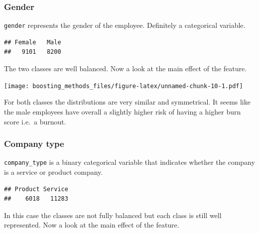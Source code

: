 \documentclass[
]{book}
\newenvironment{Shaded}{\begin{snugshade}}{\end{snugshade}}
\newcommand{\CommentTok}[1]{\textcolor[rgb]{0.56,0.35,0.01}{\textit{#1}}}
\newcommand{\FunctionTok}[1]{\textcolor[rgb]{0.00,0.00,0.00}{#1}}
\newcommand{\NormalTok}[1]{#1}
\newcommand{\SpecialCharTok}[1]{\textcolor[rgb]{0.00,0.00,0.00}{#1}}
\begin{document}
\hypertarget{gender}{%
\subsubsection{Gender}\label{gender}}

\texttt{gender} represents the gender of the employee. Definitely a categorical variable.

\begin{Shaded}
\end{Shaded}

\begin{verbatim}
## Female   Male 
##   9101   8200
\end{verbatim}

The two classes are well balanced. Now a look at the main effect of the feature.

\texttt{[image: boosting\_methods\_files/figure-latex/unnamed-chunk-10-1.pdf]}

For both classes the distributions are very similar and symmetrical. It seems like the male employees have overall a slightly higher risk of having a higher burn score i.e.~a burnout.

\hypertarget{company-type}{%
\subsubsection{Company type}\label{company-type}}

\texttt{company\_type} is a binary categorical variable that indicates whether the company is a service or product company.

\begin{Shaded}
\end{Shaded}

\begin{verbatim}
## Product Service 
##    6018   11283
\end{verbatim}

In this case the classes are not fully balanced but each class is still well represented. Now a look at the main effect of the feature.
\end{document}
